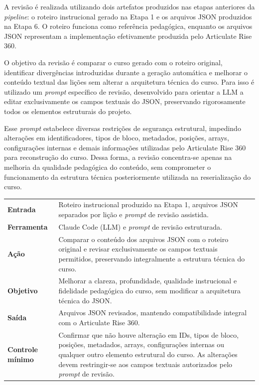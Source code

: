 \documentclass[12pt,a4paper]{article}
\newcommand{\campo}[1]{\textcolor{azulinst}{\textbf{#1}}}
\begin{document}
A revisão é realizada utilizando dois artefatos produzidos nas etapas anteriores da \textit{pipeline}: o roteiro instrucional gerado na Etapa 1 e os arquivos JSON produzidos na Etapa 6. O roteiro funciona como referência pedagógica, enquanto os arquivos JSON representam a implementação efetivamente produzida pelo Articulate Rise 360.

O objetivo da revisão é comparar o curso gerado com o roteiro original, identificar divergências introduzidas durante a geração automática e melhorar o conteúdo textual das lições sem alterar a arquitetura técnica do curso. Para isso é utilizado um \textit{prompt} específico de revisão, desenvolvido para orientar a LLM a editar exclusivamente os campos textuais do JSON, preservando rigorosamente todos os elementos estruturais do projeto.

Esse \textit{prompt} estabelece diversas restrições de segurança estrutural, impedindo alterações em identificadores, tipos de bloco, metadados, posições, arrays, configurações internas e demais informações utilizadas pelo Articulate Rise 360 para reconstrução do curso. Dessa forma, a revisão concentra-se apenas na melhoria da qualidade pedagógica do conteúdo, sem comprometer o funcionamento da estrutura técnica posteriormente utilizada na reserialização do curso.

\begin{longtable}{p{}p{}}
\toprule

\campo{Entrada} &
Roteiro instrucional produzido na Etapa 1, arquivos JSON separados por lição e \textit{prompt} de revisão assistida. \\[0.05cm]

\campo{Ferramenta} &
Claude Code (LLM) e \textit{prompt} de revisão estruturada. \\[0.05cm]

\campo{Ação} &
Comparar o conteúdo dos arquivos JSON com o roteiro original e revisar exclusivamente os campos textuais permitidos, preservando integralmente a estrutura técnica do curso. \\[0.05cm]

\campo{Objetivo} &
Melhorar a clareza, profundidade, qualidade instrucional e fidelidade pedagógica do curso, sem modificar a arquitetura técnica do JSON. \\[0.05cm]

\campo{Saída} &
Arquivos JSON revisados, mantendo compatibilidade integral com o Articulate Rise 360. \\[0.05cm]

\campo{Controle mínimo} &
Confirmar que não houve alteração em IDs, tipos de bloco, posições, metadados, arrays, configurações internas ou qualquer outro elemento estrutural do curso. As alterações devem restringir-se aos campos textuais autorizados pelo \textit{prompt} de revisão. \\[0.05cm]

\bottomrule
\end{longtable}
\end{document}
